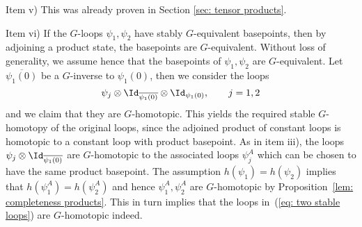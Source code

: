 Item v) This was already proven in Section \ref{sec: tensor products}.

Item vi)  If the $G$-loops $\psi_1,\psi_2$ have stably $G$-equivalent basepoints, then by adjoining a product state, the basepoints are $G$-equivalent. Without loss of generality, we assume hence that the basepoints of 
$\psi_1,\psi_2$ are $G$-equivalent. Let $\overline{\psi_1(0)}$ be a $G$-inverse to $\psi_1(0)$, then we consider the loops
\begin{equation} \label{eq: two stable loops}
\psi_j \otimes \Id_{\overline{\psi_1(0)}}  \otimes \Id_{\psi_1(0)}, \qquad j=1,2
\end{equation}
and we claim that they are $G$-homotopic. This yields the required stable $G$-homotopy of the original loops, since the adjoined product of constant loops is homotopic to a constant  loop with product basepoint. As in item iii), the loops 
$
\psi_j \otimes \Id_{\overline{\psi_1(0)}} 
$
are $G$-homotopic to the associated loops $\psi^A_j$ which can be chosen to have the same product basepoint. The assumption $h(\psi_1)=h(\psi_2)$ implies that $h(\psi^A_1)=h(\psi^A_2)$ and hence $\psi^A_1,\psi^A_2$ are $G$-homotopic by Proposition~\ref{lem: completeness products}. This in turn implies that the loops in~(\ref{eq: two stable loops}) are $G$-homotopic indeed.

\cleardoublepage

